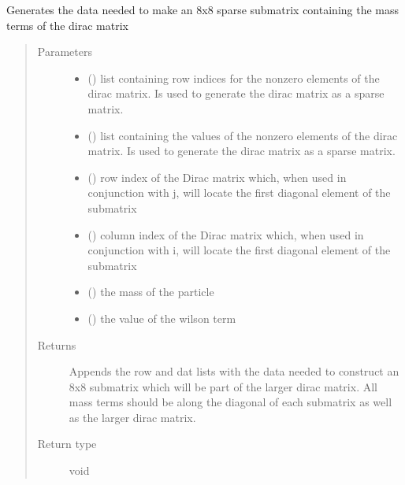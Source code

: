 \documentclass[letterpaper,10pt,english]{sphinxmanual}
\begin{document}
\begin{fulllineitems}
\label{\detokenize{index:su2.masseo}}
Generates the data needed to make an 8x8 sparse submatrix
containing the mass terms of the dirac matrix
\begin{quote}\begin{description}
\item[{Parameters}] \leavevmode\begin{itemize}
\item {} 
 () \textendash{} list containing row indices for the non\sphinxhyphen{}zero elements of the
dirac matrix. Is used to generate the dirac matrix as a sparse
matrix.

\item {} 
 () \textendash{} list containing the values of the non\sphinxhyphen{}zero elements of the
dirac matrix. Is used to generate the dirac matrix as a sparse
matrix.

\item {} 
 () \textendash{} row index of the Dirac matrix which, when used in conjunction
with j, will locate the first diagonal element of the submatrix

\item {} 
 () \textendash{} column index of the Dirac matrix which, when used in
conjunction with i, will locate the first diagonal element of
the submatrix

\item {} 
 () \textendash{} the mass of the particle

\item {} 
 () \textendash{} the value of the wilson term

\end{itemize}

\item[{Returns}] \leavevmode
Appends the row and dat lists with the data needed to construct
an 8x8 submatrix which will be part of the larger dirac matrix.
All mass terms should be along the diagonal of each submatrix
as well as the larger dirac matrix.

\item[{Return type}] \leavevmode
void

\end{description}\end{quote}

\end{fulllineitems}
\end{document}
